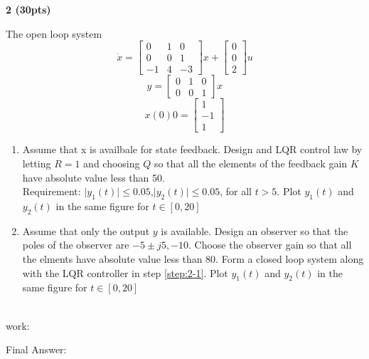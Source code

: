 \documentclass[11pt]{article}
\newcommand\question[5]{
  
  \textbf{\Large{#1 (#2)\\}}
  \large{#3\phantom{.}}\\
  work:
  #4\phantom{.}

  \finalAnswer{#5}\phantom{.}
}
\newcommand\finalAnswer[1]{
  \large{
  Final Answer:
  
  #1
  }  
}
\begin{document}
\question{2}{30pts}{
  The open loop system
  \begin{equation}
    \dot x =
    \begin{bmatrix}
      0 & 1 & 0 \\
      0 & 0 & 1 \\
      -1 & 4 & -3
    \end{bmatrix}x +
    \begin{bmatrix}
      0\\
      0\\
      2
    \end{bmatrix}u
  \end{equation}
  \begin{equation}
    y =
    \begin{bmatrix}
      0 & 1 & 0 \\
      0 & 0 & 1
    \end{bmatrix}x
  \end{equation}
  \begin{equation}
    x(0)0 =
    \begin{bmatrix}
      1 \\
      -1\\
      1
    \end{bmatrix}
  \end{equation}
  \begin{enumerate}[\arabic*)]
  \item Assume that x is availbale for state feedback. Design and LQR control law by letting $R=1$ and choosing
    $Q$ so that all the elements of the feedback gain $K$ have absolute value less than 50.\\
    Requirement: $\vert y_1(t)\vert \le 0.05$,$\vert y_2(t)\vert \le 0.05$, for all $t > 5$. Plot $y_1(t)$ and
    $y_2(t)$ in the same figure for $t \in [0,20]$ \label{step:2-1}
  \item Assume that only the output $y$ is available. Design an observer so that the poles of the observer are
    $-5 \pm j5, -10$. Choose the observer gain so that all the elments have absolute value less than 80. Form a
    closed loop system along with the LQR controller in step \ref{step:2-1}. Plot $y_1(t)$ and $y_2(t)$ in the
    same figure for $t \in [0,20]$
  \end{enumerate}
}{}{}
\end{document}
